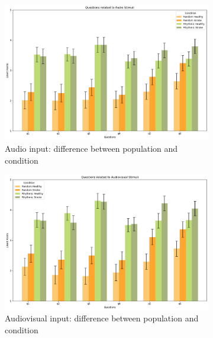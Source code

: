 \begin{figure}[htbp]
    \begin{subfigure}[htbp]{0.5\textwidth}
        \centering
        \includegraphics[width=\textwidth]{bar_plots/plot_pop_adio.png}
        \caption{Audio input: difference between population and condition}
        \label{fig: bar_visual_pop} 
    \end{subfigure} 
    \begin{subfigure}[htbp]{0.5\textwidth}
        \centering
        \includegraphics[width=\textwidth]{bar_plots/plot_pop_audiovisual.png}
        \caption{Audiovisual input: difference between population and condition}
        \label{fig: bar_audio_pop} 
    \end{subfigure} 
    \begin{subfigure}[htbp]{0.5\textwidth}
        \centering

\end{subfigure}
\end{figure}
